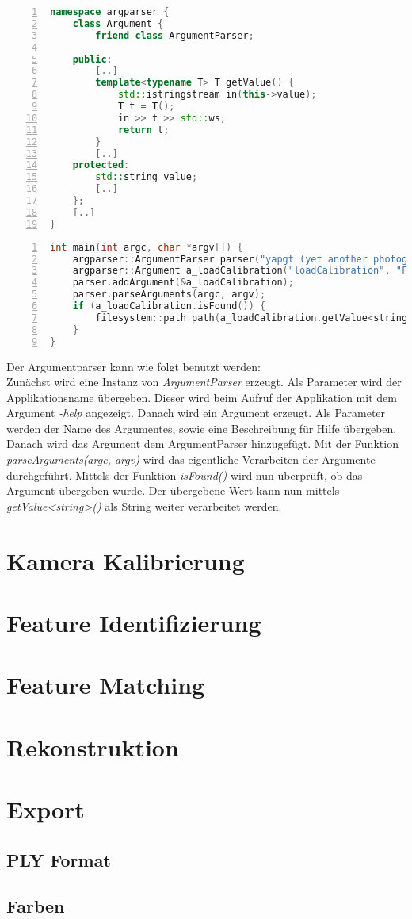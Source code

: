 \begin{lstlisting}[language=c++, numbers=left, breaklines=true, breakatwhitespace=false, label=lst:argparser_argument_friend]
namespace argparser {
    class Argument {
        friend class ArgumentParser;

    public:
        [..]
        template<typename T> T getValue() {
            std::istringstream in(this->value);
            T t = T();
            in >> t >> std::ws;
            return t;
        }
        [..]
    protected:
        std::string value;
        [..]
    };
    [..]
}
\end{lstlisting}

\begin{lstlisting}[language=c++, numbers=left, breaklines=true, breakatwhitespace=false, label=lst:argparser_example, caption=Argparser Verwendung]
int main(int argc, char *argv[]) {
    argparser::ArgumentParser parser("yapgt (yet another photogrammetry tool)");
    argparser::Argument a_loadCalibration("loadCalibration", "Filepath to load calibration from");    
    parser.addArgument(&a_loadCalibration);
    parser.parseArguments(argc, argv);
    if (a_loadCalibration.isFound()) {
        filesystem::path path(a_loadCalibration.getValue<string>());
    }
}
\end{lstlisting}

Der Argumentparser kann wie folgt benutzt werden:\\
Zunächst wird eine Instanz von \emph{ArgumentParser} erzeugt.
Als Parameter wird der Applikationsname übergeben.
Dieser wird beim Aufruf der Applikation mit dem Argument \emph{-help} angezeigt.
Danach wird ein Argument erzeugt.
Als Parameter werden der Name des Argumentes, sowie eine Beschreibung für Hilfe übergeben.
Danach wird das Argument dem ArgumentParser hinzugefügt.
Mit der Funktion \emph{parseArguments(argc, argv)} wird das eigentliche Verarbeiten der Argumente durchgeführt.
Mittels der Funktion \emph{isFound()} wird nun überprüft, ob das Argument übergeben wurde.
Der übergebene Wert kann nun mittels \emph{getValue<string>()} als String weiter verarbeitet werden.

\section{Kamera Kalibrierung}

\section{Feature Identifizierung}

\section{Feature Matching}

\section{Rekonstruktion}

\section{Export}
\subsection{PLY Format}
\subsection{Farben}